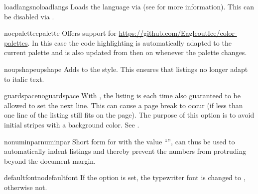 \documentclass{sopra-base}
\begin{document}
    \begin{argument}{loadlangs}{noloadlangs}
        Loads the language  via  (see  for more information). This can be disabled via . 
    \end{argument}

    \begin{argument}{nocpalette}{cpalette}
        Offers support for \href{color-palettes}{https://github.com/EagleoutIce/color-palettes}. In this case the code highlighting is automatically adapted to the current palette and is also updated from then on whenever the palette changes.
    \end{argument}

    \begin{argument}{noupshape}{upshape}
        Adds  to the style. This ensures that listings no longer adapt to italic text.
    \end{argument}

    \begin{argument}{guardspace}{noguardspace}
        With , the listing is each time also guaranteed to be allowed to set the next line. This can cause a page break to occur (if less than one line of the listing still fits on the page). The purpose of this option is to avoid initial stripes with a background color. See .
    \end{argument}

    \begin{argument}{nonuminpar}{numinpar}
        Short form for  with the value ``{\makeatletter\@@sol@numinpar@length}'', can thus be used
        to automatically indent listings and thereby prevent the numbers from protruding beyond the document margin.
    \end{argument}

    \begin{argument}{defaultfont}{nodefaultfont}
        If the option is set, the typewriter font is changed to , otherwise not.
    \end{argument}
\end{document}
